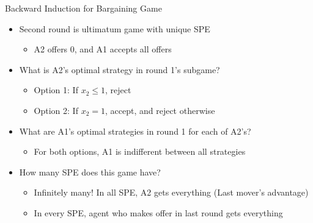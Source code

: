 \documentclass[11pt,aspectratio=169]{beamer}
\begin{document}
  \begin{frame}{Backward Induction for Bargaining Game}
   \begin{itemize}[<+->]
   \setlength{\itemsep}{0.5em}
    \item Second round is ultimatum game with \alert{unique SPE}
    \begin{itemize}
     \item A2 offers $0$, and A1 accepts all offers 
    \end{itemize}
    \item What is A2's optimal strategy in round 1's subgame?
    \begin{itemize}
     \item \alert{Option 1}: If $x_2 \leq 1$, reject 
     \item \alert{Option 2}: If $x_2=1$, accept, and reject otherwise
    \end{itemize}
    \item What are A1's optimal strategies in round 1 for each of A2's?
    \begin{itemize}
     \item For both options, A1 is indifferent between all strategies
    \end{itemize}
    \item How many SPE does this game have?
    \begin{itemize}
     \item Infinitely many! In all SPE, A2 gets everything (\alert{Last mover's advantage})
     \item In every SPE, agent who makes offer in last round gets everything
    \end{itemize}
   \end{itemize}
  \end{frame}
\end{document}
